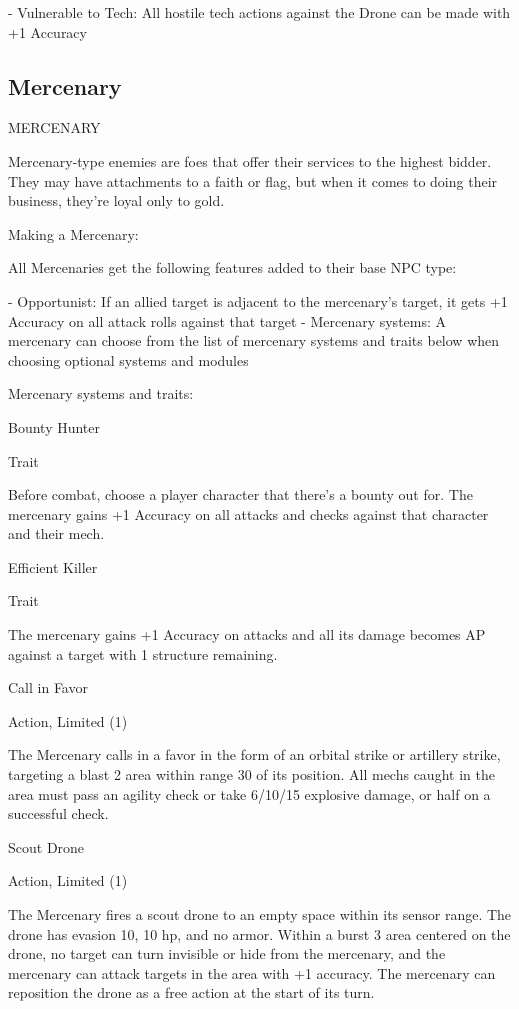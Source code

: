                                                                                                                 


     -   Vulnerable to Tech: All hostile tech actions against the Drone can be made with +1  
         Accuracy  

\subsection{Mercenary}
                                                MERCENARY  

Mercenary-type enemies are foes that offer their services to the highest bidder. They may have  
attachments to a faith or flag, but when it comes to doing their business, they’re loyal only to  
gold.    
 
 
Making a Mercenary:
 
All Mercenaries get the following features added to their base NPC type:
 
     -   Opportunist: If an allied target is adjacent to the mercenary’s target, it gets +1 Accuracy  
         on all attack rolls against that target  
     -   Mercenary systems: A mercenary can choose from the list of mercenary systems and  
         traits below when choosing optional systems and modules  

Mercenary systems and traits:
 
Bounty Hunter
 
Trait
 
Before combat, choose a player character that there’s a bounty out for. The mercenary gains +1  
Accuracy on all attacks and checks against that character and their mech.
 

Efficient Killer
 
Trait
 
The mercenary gains +1 Accuracy on attacks and all its damage becomes AP against a target  
with 1 structure remaining.
 

Call in Favor
 
Action, Limited (1)
 
The Mercenary calls in a favor in the form of an orbital strike or artillery strike, targeting a blast 2  
area within range 30 of its position. All mechs caught in the area must pass an agility check or  
take 6/10/15 explosive damage, or half on a successful check.
 

Scout Drone
 
Action, Limited (1)
 
The Mercenary fires a scout drone to an empty space within its sensor range. The drone has  
evasion 10, 10 hp, and no armor. Within a burst 3 area centered on the drone, no target can turn  
invisible or hide from the mercenary, and the mercenary can attack targets in the area with +1  
accuracy. The mercenary can reposition the drone as a free action at the start of its turn.
 

